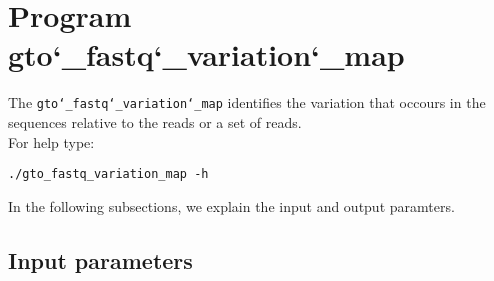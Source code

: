 \section{Program gto\char`_fastq\char`_variation\char`_map}
The \texttt{gto\char`_fastq\char`_variation\char`_map} identifies the variation that occours in the sequences relative to the reads or a set of reads.\\
For help type:
\begin{lstlisting}
./gto_fastq_variation_map -h
\end{lstlisting}
In the following subsections, we explain the input and output paramters.

\subsection*{Input parameters}


